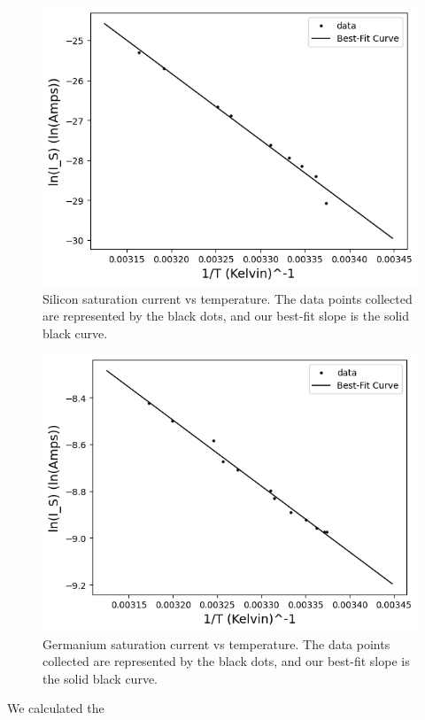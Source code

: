 \documentclass[12pt,letterpaper,twocolumn]{article}
\begin{document}
\begin{figure}[h]
	\includegraphics[width = .5\textwidth]{linSiSatCurrent.png}
	\caption{Silicon saturation current vs temperature. The data points collected are represented by the black dots, and our best-fit slope is the solid black curve.\label{g3}}
\end{figure}
\begin{figure}[h]
	\includegraphics[width = .5\textwidth]{linGeSatCurrent.png}
	\caption{Germanium saturation current vs temperature. The data points collected are represented by the black dots, and our best-fit slope is the solid black curve.\label{g4}}
\end{figure}
We calculated the 

%
%
%
%
\end{document}
